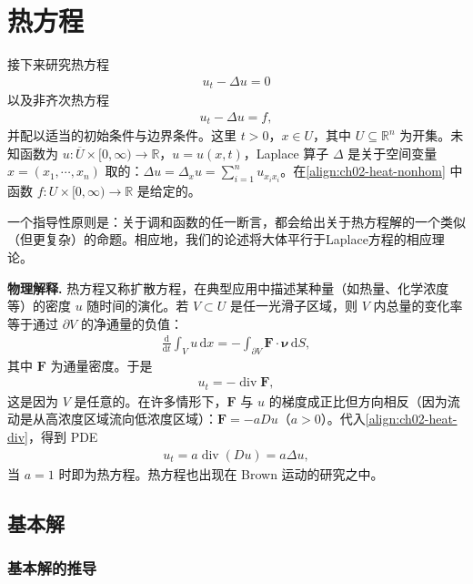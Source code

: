 \documentclass[../../main.tex]{subfiles}
\begin{document}
\section{热方程}\label{section:ch02-heat}

接下来研究热方程
\begin{align}\label{align:ch06-eta界}
u_t-\Delta u=0
\end{align}
以及非齐次热方程
\begin{align}\label{align:ch02-heat-nonhom}
u_t-\Delta u=f,
\end{align}
并配以适当的初始条件与边界条件。这里 $t>0$，$x\in U$，其中 $U\subseteq\mathbb{R}^n$ 为开集。未知函数为 $u:\overline{U}\times[0,\infty)\to\mathbb{R}$，$u=u(x,t)$，Laplace 算子 $\Delta$ 是关于空间变量 $x=(x_1,\cdots,x_n)$ 取的：$\Delta u=\Delta_xu=\sum_{i=1}^n u_{x_i x_i}$。在\eqref{align:ch02-heat-nonhom} 中函数 $f:U\times[0,\infty)\to\mathbb{R}$ 是给定的。

一个指导性原则是：关于调和函数的任一断言，都会给出关于热方程解的一个类似（但更复杂）的命题。相应地，我们的论述将大体平行于Laplace方程的相应理论。

\textbf{物理解释.} 热方程又称扩散方程，在典型应用中描述某种量（如热量、化学浓度等）的密度 $u$ 随时间的演化。若 $V\subset U$ 是任一光滑子区域，则 $V$ 内总量的变化率等于通过 $\partial V$ 的净通量的负值：
\begin{align*}
\frac{\mathrm{d}}{\mathrm{d}t}\int_V u\,\mathrm{d}x=-\int_{\partial V}\mathbf{F}\cdot\boldsymbol{\nu}\,\mathrm{d}S,
\end{align*}
其中 $\mathbf{F}$ 为通量密度。于是
\begin{align}\label{align:ch02-heat-div}
u_t=-\operatorname{div}\mathbf{F},
\end{align}
这是因为 $V$ 是任意的。在许多情形下，$\mathbf{F}$ 与 $u$ 的梯度成正比但方向相反（因为流动是从高浓度区域流向低浓度区域）：$\mathbf{F}=-aDu$（$a>0$）。代入\eqref{align:ch02-heat-div}，得到 PDE
\begin{align*}
u_t=a\operatorname{div}(Du)=a\Delta u,
\end{align*}
当 $a=1$ 时即为热方程。热方程也出现在 Brown 运动的研究之中。

\subsection{基本解}\label{subsection:ch02-heat-fundamental}

\subsubsection{基本解的推导}
\end{document}
